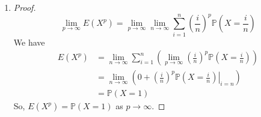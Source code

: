 \documentclass{article}
\begin{document}
\begin{enumerate}
        \item \begin{proof}
            $$\lim_{p\to\infty}E\left(X^p\right)=\lim_{p\to\infty}{\lim_{n\to\infty}\sum_{i=1}^n \left(\frac{i}{n}\right)^p \mathbb{P}\left(X=\frac{i}{n}\right)}$$
            We have
            \begin{align*}
                E\left(X^p\right)
                &=\lim_{n\to\infty}\sum_{i=1}^n \left(\lim_{p\to\infty}\left(\frac{i}{n}\right)^p\mathbb{P}\left(X=\frac{i}{n}\right)\right)\\
                &=\lim_{n\to \infty}\left(0+\left(\frac{i}{n}\right)^p \left .\mathbb{P}\left(X=\frac{i}{n}\right)\right|_{i=n}\right)\\
                &=\mathbb{P}\left(X=1\right)
            \end{align*}
            So, $E\left(X^p\right)=\mathbb{P}\left(X=1\right)$ as $p\to \infty$.
        \end{proof}

\pagebreak


\end{enumerate}
\end{document}
